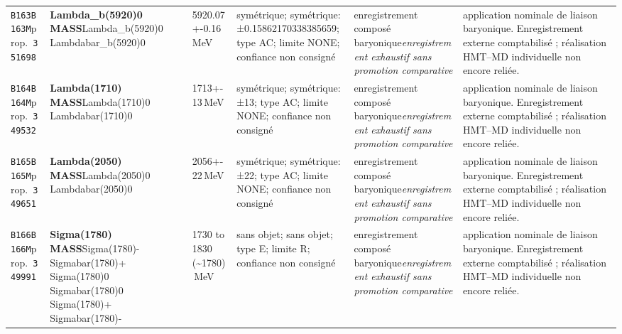 \begin{landscape}
\begin{longtable}{L{1.85cm}L{4.45cm}L{2.35cm}L{4.05cm}L{3.35cm}L{7.15cm}}
\texttt{B163}\newline \texttt{B163M}\newline prop.\ \texttt{351698} & \textbf{Lambda\_\allowbreak{}b(5920)0 MASS}\newline Lambda\_\allowbreak{}b(5920)0 \textbar{}\allowbreak{} Lambdabar\_\allowbreak{}b(5920)0 & 5920.07+-0.16\,MeV & symétrique; symétrique: ±0.15862170338385659; type AC; limite NONE; confiance non consigné & enregistrement composé baryonique\newline \emph{enregistrement exhaustif sans promotion comparative} & application nominale de liaison baryonique. Enregistrement externe comptabilisé ; réalisation HMT--MD individuelle non encore reliée. \\
\texttt{B164}\newline \texttt{B164M}\newline prop.\ \texttt{349532} & \textbf{Lambda(1710) MASS}\newline Lambda(1710)0 \textbar{}\allowbreak{} Lambdabar(1710)0 & 1713+-13\,MeV & symétrique; symétrique: ±13; type AC; limite NONE; confiance non consigné & enregistrement composé baryonique\newline \emph{enregistrement exhaustif sans promotion comparative} & application nominale de liaison baryonique. Enregistrement externe comptabilisé ; réalisation HMT--MD individuelle non encore reliée. \\
\texttt{B165}\newline \texttt{B165M}\newline prop.\ \texttt{349651} & \textbf{Lambda(2050) MASS}\newline Lambda(2050)0 \textbar{}\allowbreak{} Lambdabar(2050)0 & 2056+-22\,MeV & symétrique; symétrique: ±22; type AC; limite NONE; confiance non consigné & enregistrement composé baryonique\newline \emph{enregistrement exhaustif sans promotion comparative} & application nominale de liaison baryonique. Enregistrement externe comptabilisé ; réalisation HMT--MD individuelle non encore reliée. \\
\texttt{B166}\newline \texttt{B166M}\newline prop.\ \texttt{349991} & \textbf{Sigma(1780) MASS}\newline Sigma(1780)- \textbar{}\allowbreak{} Sigmabar(1780)+ \textbar{}\allowbreak{} Sigma(1780)0 \textbar{}\allowbreak{} Sigmabar(1780)0 \textbar{}\allowbreak{} Sigma(1780)+ \textbar{}\allowbreak{} Sigmabar(1780)- & 1730 to 1830 (\textasciitilde{}1780)\,MeV & sans objet; sans objet; type E; limite R; confiance non consigné & enregistrement composé baryonique\newline \emph{enregistrement exhaustif sans promotion comparative} & application nominale de liaison baryonique. Enregistrement externe comptabilisé ; réalisation HMT--MD individuelle non encore reliée. \\

\end{longtable}
\end{landscape}

